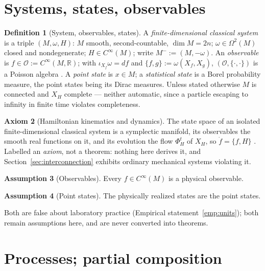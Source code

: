 \documentclass[12pt,a4paper]{article}
\theoremstyle{definition}
\newtheorem{definition}{Definition}[section]
\newtheorem{axiom}[definition]{Axiom}
\newtheorem{assumption}[definition]{Assumption}
\theoremstyle{plain}
\theoremstyle{commentary}
\newcommand{\R}{\mathbb{R}}
\newcommand{\Cinf}{C^{\infty}}
\newcommand{\Oc}{\mathcal{O}}
\begin{document}
\section{Systems, states, observables}

\begin{definition}[System, observables, states]\label{def:system}
A \emph{finite-dimensional classical system} is a triple $(M,\omega,H)$: $M$ smooth,
second-countable, $\dim M=2n$; $\omega\in\Omega^{2}(M)$ closed and nondegenerate;
$H\in\Cinf(M)$; write $M^{-}:=(M,-\omega)$. An \emph{observable} is $f\in\Oc:=\Cinf(M,\R)$;
with $\iota_{X_f}\omega=df$ and $\{f,g\}:=\omega(X_f,X_g)$, $(\Oc,\{\cdot,\cdot\})$ is a
Poisson algebra \cite{Arnold1989}. A \emph{point state} is $x\in M$; a \emph{statistical
state} is a Borel probability measure, the point states being its Dirac measures. Unless
stated otherwise $M$ is connected and $X_H$ complete --- neither automatic, since a particle
escaping to infinity in finite time violates completeness.
\end{definition}

\begin{axiom}[Hamiltonian kinematics and dynamics]\label{ax:ham}
The state space of an isolated finite-dimensional classical system is a symplectic manifold,
its observables the smooth real functions on it, and its evolution the flow $\Phi^{t}_{H}$ of
$X_H$, so $\dot f=\{f,H\}$ \cite{AbrahamMarsden1978,Arnold1989}. Labelled an \emph{axiom},
not a theorem: nothing here derives it, and Section~\ref{sec:interconnection} exhibits
ordinary mechanical systems violating it.
\end{axiom}

\begin{assumption}[Observables]\label{asm:obs}
Every $f\in\Cinf(M)$ is a physical observable.
\end{assumption}

\begin{assumption}[Point states]\label{asm:points}
The physically realized states are the point states.
\end{assumption}

Both are false about laboratory practice (Empirical statement~\ref{emp:units}); both remain
assumptions here, and are never converted into theorems.

\section{Processes; partial composition}
\end{document}
